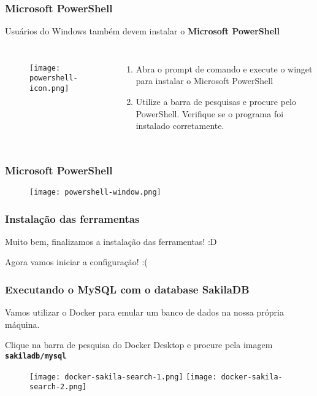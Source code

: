 \documentclass[t, 10pt, aspectratio=169, table, x11names]{beamer}
\begin{document}
	\begin{frame}
		\frametitle{Microsoft PowerShell}
		Usuários do Windows também devem instalar o \textbf{Microsoft PowerShell}
		\vspace{0.6cm}
		\begin{columns}
			\begin{figure}[h]
				\texttt{[image: powershell-icon.png]}
			\end{figure}
			\begin{enumerate}
				\item Abra o prompt de comando e execute o winget para instalar o Microsoft PowerShell
				
				\vspace{0.4cm}
				\item Utilize a barra de pesquisas e procure pelo PowerShell. Verifique se o programa foi instalado corretamente.
			\end{enumerate}
		\end{columns}
	\end{frame}
	
	\begin{frame}
		\frametitle{Microsoft PowerShell}
		\vspace{0.5cm}
		\begin{figure}[h]
			\texttt{[image: powershell-window.png]}
		\end{figure}
	\end{frame}
	
	\begin{frame}
		\frametitle{Instalação das ferramentas}
		\vspace{0.5cm}
		\begin{center}
			\LARGE
			Muito bem, finalizamos a instalação das ferramentas! :D
		\end{center}
		\vspace{1cm}
		\begin{center}
			\LARGE
			Agora vamos iniciar a configuração! :(
		\end{center}
	\end{frame}
	
	\begin{frame}[t]
		\frametitle{Executando o MySQL com o database SakilaDB}
		Vamos utilizar o Docker para emular um banco de dados na nossa própria máquina.
		
		Clique na barra de pesquisa do Docker Desktop e procure pela imagem \textbf{\texttt{sakiladb/mysql}}
		\vspace{0.3cm}
		\begin{figure}[h]
			\texttt{[image: docker-sakila-search-1.png]}
			\hspace{0.5cm}
			\texttt{[image: docker-sakila-search-2.png]}
		\end{figure}
	\end{frame}
	
\end{document}
